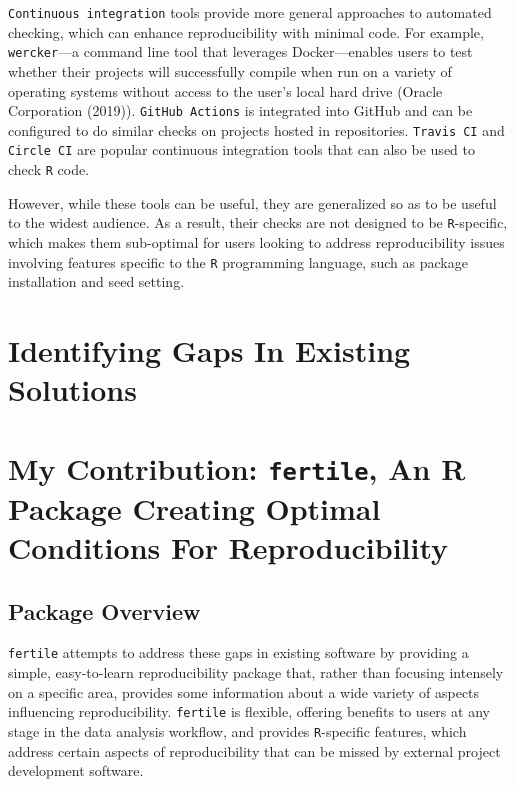 \documentclass[12pt,twoside]{reedthesis}
\begin{document}
\texttt{Continuous\ integration} tools provide more general approaches
to automated checking, which can enhance reproducibility with minimal
code. For example, \texttt{wercker}---a command line tool that leverages
Docker---enables users to test whether their projects will successfully
compile when run on a variety of operating systems without access to the
user's local hard drive (Oracle Corporation (2019)).
\texttt{GitHub\ Actions} is integrated into GitHub and can be configured
to do similar checks on projects hosted in repositories.
\texttt{Travis\ CI} and \texttt{Circle\ CI} are popular continuous
integration tools that can also be used to check \texttt{R} code.

However, while these tools can be useful, they are generalized so as to
be useful to the widest audience. As a result, their checks are not
designed to be \texttt{R}-specific, which makes them sub-optimal for
users looking to address reproducibility issues involving features
specific to the \texttt{R} programming language, such as package
installation and seed setting.

\section{Identifying Gaps In Existing
Solutions}\label{identifying-gaps-in-existing-solutions}

\section{\texorpdfstring{My Contribution: \texttt{fertile}, An R Package
Creating Optimal Conditions For
Reproducibility}{My Contribution: fertile, An R Package Creating Optimal Conditions For Reproducibility}}\label{my-contribution-fertile-an-r-package-creating-optimal-conditions-for-reproducibility}

\subsection{Package Overview}\label{package-overview}

\texttt{fertile} attempts to address these gaps in existing software by
providing a simple, easy-to-learn reproducibility package that, rather
than focusing intensely on a specific area, provides some information
about a wide variety of aspects influencing reproducibility.
\texttt{fertile} is flexible, offering benefits to users at any stage in
the data analysis workflow, and provides \texttt{R}-specific features,
which address certain aspects of reproducibility that can be missed by
external project development software.
\end{document}
